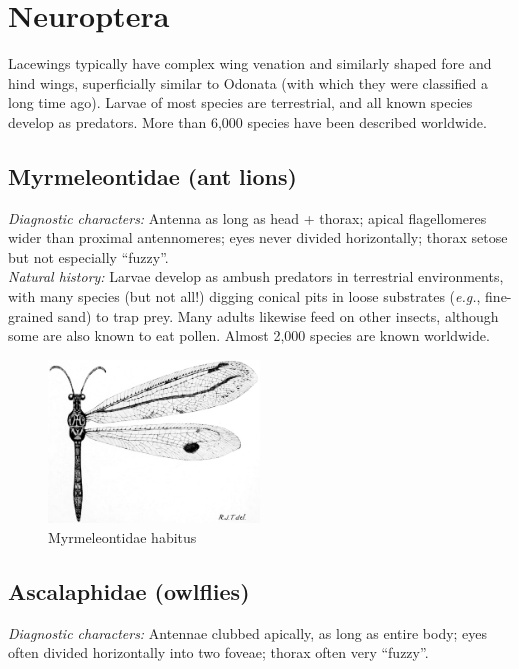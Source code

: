 \documentclass[letterpaper, 11pt]{article}
\begin{document}
\section{Neuroptera}
Lacewings typically have complex wing venation and similarly shaped fore and hind wings, superficially similar to Odonata (with which they were classified a long time ago). Larvae of most species are terrestrial, and all known species develop as predators. More than 6,000 species have been described worldwide.\\

\subsection{Myrmeleontidae (ant lions)}
\noindent{}\textit{Diagnostic characters:} Antenna as long as head + thorax; apical flagellomeres wider than proximal antennomeres; eyes never divided horizontally; thorax setose but not especially ``fuzzy''.\\

\noindent{}\textit{Natural history:} Larvae develop as ambush predators in terrestrial environments, with many species (but not all!) digging conical pits in loose substrates (\textit{e.g.}, fine-grained sand) to trap prey. Many adults likewise feed on other insects, although some are also known to eat pollen. Almost 2,000 species are known worldwide.\\

\begin{figure}[ht!]
  \centering
    \includegraphics[width=0.5\textwidth]{MyrmeleontidHabitus}
  \caption{Myrmeleontidae habitus \citep[][Fig. III.8]{tillyard1916}}
  \label{fig:myrmeleo}
\end{figure}

\subsection{Ascalaphidae (owlflies)}
\noindent{}\textit{Diagnostic characters:} Antennae clubbed apically, as long as entire body; eyes often divided horizontally into two foveae; thorax often very ``fuzzy''.\\
\end{document}

